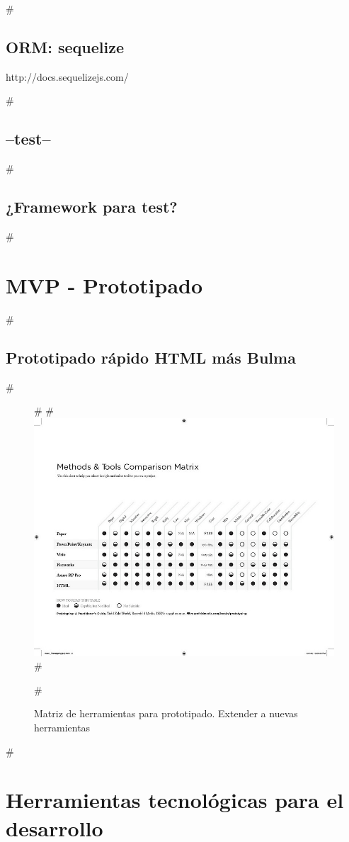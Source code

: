 #\subsection{ORM: sequelize}
http://docs.sequelizejs.com/

#\subsection{--test--}
#\subsection{¿Framework para test?}


#\section{MVP - Prototipado}
#\subsection{Prototipado rápido HTML más Bulma}

#\begin{figure}
#\centering
#\includegraphics[width=16cm]{Img/UX/UX-matrix.jpg}
#\caption[Proto-persona (optional short caption)]{\label{us_figure} Matriz de herramientas para prototipado. Extender a nuevas herramientas}
#\end{figure}

#\section{Herramientas tecnológicas para el desarrollo}

